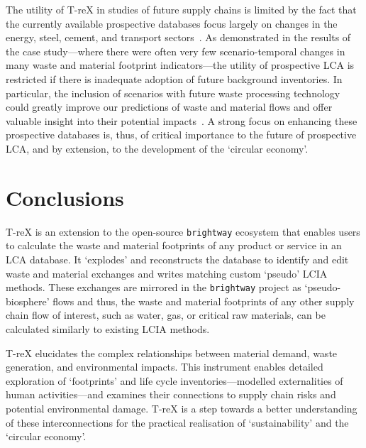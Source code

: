 \documentclass[a4paper,fleqn]{cas-dc}
\begin{document}
The utility of T-reX in studies of future supply chains is limited by the fact that the currently available prospective databases focus largely on changes in the energy, steel, cement, and transport sectors~\citep{sacchi2023premisedocs}. As demonstrated in the results of the case study---where there were often very few scenario-temporal changes in many waste and material footprint indicators---the utility of prospective LCA is restricted if there is inadequate adoption of future background inventories. In particular, the inclusion of scenarios with future waste processing technology could greatly improve our predictions of waste and material flows and offer valuable insight into their potential impacts~\citep{bisinella2024wastelca}. A strong focus on enhancing these prospective databases is, thus, of critical importance to the future of prospective LCA, and by extension, to the development of the `circular economy'.

\section{Conclusions}\label{sec:conclusions}
T-reX is an extension to the open-source \texttt{brightway} ecosystem that enables users to calculate the waste and material footprints of any product or service in an LCA database. It `explodes' and reconstructs the database to identify and edit waste and material exchanges and writes matching custom `pseudo' LCIA methods. These exchanges are mirrored in the \texttt{brightway} project as `pseudo-biosphere' flows and thus, the waste and material footprints of any other supply chain flow of interest, such as water, gas, or critical raw materials, can be calculated similarly to existing LCIA methods.

T-reX elucidates the complex relationships between material demand, waste generation, and environmental impacts. This instrument enables detailed exploration of `footprints' and life cycle inventories---modelled externalities of human activities---and examines their connections to supply chain risks and potential environmental damage. T-reX is a step towards a better understanding of these interconnections for the practical realisation of `sustainability' and the `circular economy'.
\end{document}
